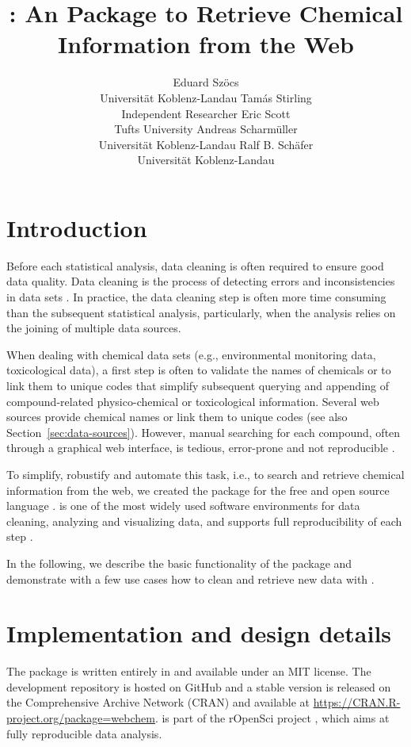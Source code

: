 \documentclass[article]{jss}
\author{
	Eduard Sz\"ocs\\Universit\"at Koblenz-Landau \And
	Tam\'as Stirling\\Independent Researcher \And
	Eric Scott\\Tufts University \AND
	Andreas Scharm\"uller\\Universit\"at Koblenz-Landau \And
    Ralf B. Sch\"afer\\Universit\"at Koblenz-Landau}
\title{\pkg{webchem}: An \proglang{R} Package to Retrieve Chemical Information from the Web}
\begin{document}
\section[Introduction]{Introduction}
Before each statistical analysis, data cleaning is often required to
ensure good data quality.  Data cleaning is the process of detecting
errors and inconsistencies in data sets \citep{Chapman_2005}.  In
practice, the data cleaning step is often more time consuming than the
subsequent statistical analysis, particularly, when the analysis
relies on the joining of multiple data sources.

When dealing with chemical data sets (e.g., environmental monitoring
data, toxicological data), a first step is often to validate the names
of chemicals or to link them to unique codes that simplify subsequent
querying and appending of compound-related physico-chemical or
toxicological information.  Several web sources provide chemical names
or link them to unique codes (see also
Section~\ref{sec:data-sources}).  However, manual searching for each
compound, often through a graphical web interface, is tedious,
error-prone and not reproducible \citep{Peng_2009}.

To simplify, robustify and automate this task, i.e., to search and
retrieve chemical information from the web, we created the
 package \citep{cran} for the free and open source
 language \citep{r_2015, Wehrens_2011}.   is
one of the most widely used software environments for data cleaning,
analyzing and visualizing data, and supports full reproducibility of
each step \citep{Marwick_2016}.

In the following, we describe the basic functionality of the package
and demonstrate with a few use cases how to clean and retrieve new
data with .


\section[Implementation and design details]{Implementation and design details}
The  package is written entirely in  and
available under an MIT license.  The development repository is hosted
on GitHub \citep{github} and a stable version is released on the
Comprehensive  Archive Network (CRAN) and available at
\url{https://CRAN.R-project.org/package=webchem}.   is
part of the rOpenSci project \citep{boettiger2015building}, which aims
at fully reproducible data analysis.
\end{document}
